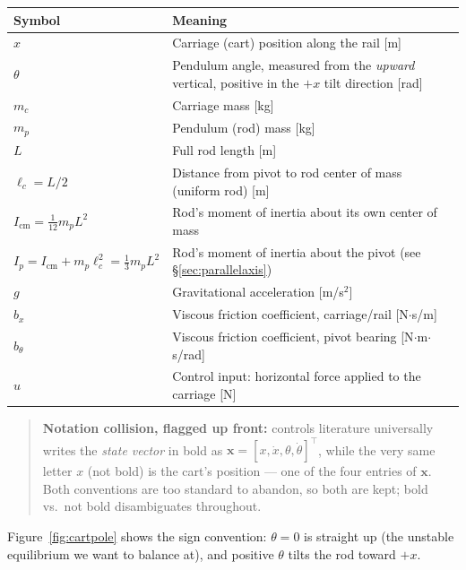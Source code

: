 \documentclass[11pt]{article}
\newcommand{\mb}[1]{\mathbf{#1}}
\begin{document}
\begin{center}
\begin{tabular}{p{}p{}}
\hline
Symbol & Meaning \\
\hline
$x$ & Carriage (cart) position along the rail [m] \\
$\theta$ & Pendulum angle, measured from the \emph{upward} vertical,
  positive in the $+x$ tilt direction [rad] \\
$m_c$ & Carriage mass [kg] \\
$m_p$ & Pendulum (rod) mass [kg] \\
$L$ & Full rod length [m] \\
$\ell_c = L/2$ & Distance from pivot to rod center of mass (uniform rod)
  [m] \\
$I_{\mathrm{cm}} = \tfrac{1}{12} m_p L^2$ & Rod's moment of inertia about
  its own center of mass \\
$I_p = I_{\mathrm{cm}} + m_p \ell_c^2 = \tfrac{1}{3} m_p L^2$ & Rod's
  moment of inertia about the pivot (see \S\ref{sec:parallelaxis}) \\
$g$ & Gravitational acceleration [m/s$^2$] \\
$b_x$ & Viscous friction coefficient, carriage/rail [N$\cdot$s/m] \\
$b_\theta$ & Viscous friction coefficient, pivot bearing
  [N$\cdot$m$\cdot$s/rad] \\
$u$ & Control input: horizontal force applied to the carriage [N] \\
\hline
\end{tabular}
\end{center}

\begin{quote}
\textbf{Notation collision, flagged up front:} controls literature
universally writes the \emph{state vector} in bold as $\mb x =
[x,\dot x,\theta,\dot\theta]^\top$, while the very same letter $x$ (not
bold) is the cart's position — one of the four entries of $\mb x$. Both
conventions are too standard to abandon, so both are kept; bold vs.\ not
bold disambiguates throughout.
\end{quote}

Figure~\ref{fig:cartpole} shows the sign convention: $\theta = 0$ is
straight up (the unstable equilibrium we want to balance at), and positive
$\theta$ tilts the rod toward $+x$.
\end{document}
